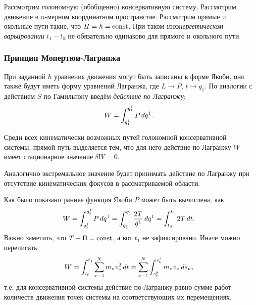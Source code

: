 \begin{to_def} 
    Рассмотрим голономную (обобщенно) консервативную систему. Рассмотрим движение в $n$-мерном координатном пространстве. Рассмотрим прямые и окольные пути такие, что $H = h = \text{const}$. При таком \textit{изоэнергетическом варьировании} $t_1-t_0$ не обязательно одинаково для прямого и окольного пути.     
\end{to_def}

\subsubsection*{Принцип Мопертюи-Лагранжа}

\begin{to_def} 
    При заданной $h$ уравнения движения могут быть записаны в форме Якоби, они также будут иметь форму уравнений Лагранжа, где $L \to P$, $t \to q_1$. По аналогии с действием $S$ по Гамильтону введём \textit{действие по Лагранжу}:
\begin{equation*}
    W = \int_{q^{1}_1}^{q_1^1} P \, d q^1.
\end{equation*} 
\end{to_def}


\begin{to_thr}
     Среди всех кинематически возможных путей голономной консервативной системы, прямой путь выделяется тем, что для него действие по Лагранжу $W$ имеет стационарное значение $\delta W = 0$.
\end{to_thr}

Аналогично экстремальное значение будет принимать действие по Лагранжу при отсутствие кинематических фокусов в рассматриваемой области. 

Как было показано раннее функция Якоби $P$ может быть вычислена, как
\begin{equation*}
    W = \int_{q^{1}_1}^{q_1^1} P \, d q^1 = \int_{q^{1}_1}^{q_1^1} \frac{2T}{\dot{q}^1} \, d q^1 = \int_{t_0}^{t_1} 2 T \, d t.
\end{equation*}
Важно заметить, что $T + \Pi = \text{const}$,  а вот $t_1$ не зафиксировано. Иначе можно переписать
\begin{equation*}
    W = \int_{t_0}^{t_1} \sum_{\nu=1}^N m_\nu v_\nu^2 \, d t 
    =
    \sum_{\nu=1}^N \int_{s_\nu^0}^{s_\nu^1} m_\nu v_\nu \, d s_\nu,
\end{equation*}
т.е. для консервативной системы действие по Лагранжу равно сумме работ количеств движения точек системы на соответствующих их перемещениях.















